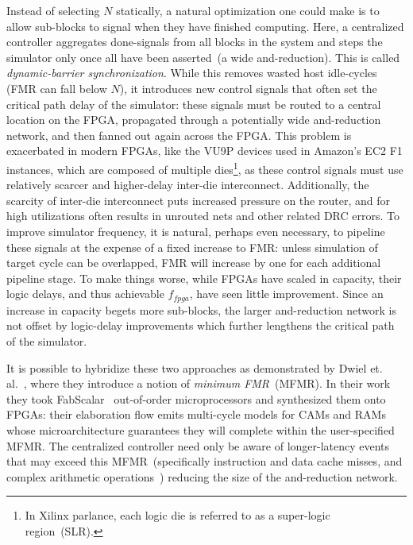 Instead of selecting $N$ statically, a natural optimization one could make is to allow sub-blocks to signal when they have
finished computing. Here, a centralized controller aggregates done-signals from all
blocks in the system and steps the simulator only once all have been
asserted~(a wide and-reduction). This is called \emph{dynamic-barrier
synchronization}. While this removes wasted host idle-cycles (FMR can fall
below $N$), it introduces new control signals that often set the critical
path delay of the simulator: these signals must be routed to a central
location on the FPGA, propagated through a potentially wide and-reduction network, and then fanned out again across the FPGA.
This problem is exacerbated in modern FPGAs, like the VU9P devices used in Amazon's EC2 F1 instances, which are composed of multiple
dies\footnote{In Xilinx parlance, each logic die is referred to as a
super-logic region~(SLR).}, as these control signals must use relatively
scarcer and higher-delay inter-die interconnect. Additionally, the scarcity of inter-die interconnect
puts increased pressure on the router, and for high utilizations often results
in unrouted nets and other related DRC errors.  To improve simulator
frequency, it is natural, perhaps even necessary, to pipeline these signals at
the expense of a fixed increase to FMR: unless simulation of target cycle can
be overlapped, FMR will increase by one for each additional pipeline stage. To make things worse, while
FPGAs have scaled in capacity, their logic delays, and thus achievable
$f_{fpga}$, have seen little improvement. Since an increase in capacity begets
more sub-blocks, the larger and-reduction network is not offset by logic-delay
improvements which further lengthens the critical path of the simulator.

It is possible to hybridize these two approaches as demonstrated by Dwiel et. al.~\cite{fabscalarfpga},
where they introduce a notion of \emph{minimum FMR}~(MFMR). In their work they took FabScalar~\cite{fabscalar} out-of-order microprocessors
and synthesized them onto FPGAs: their elaboration flow emits multi-cycle models for CAMs and RAMs whose
microarchitecture guarantees they will complete within the user-specified MFMR. The centralized controller
need only be aware of longer-latency events that may exceed this MFMR~(specifically instruction and data cache misses, and complex
arithmetic operations~\cite{fabscalarfpga}) reducing the size of the and-reduction network.

